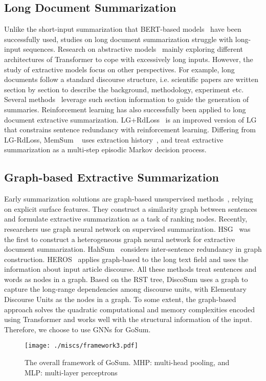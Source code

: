 \documentclass[11pt,a4paper]{article}
\begin{document}
\subsection{Long Document Summarization}
Unlike the short-input summarization that BERT-based models~\cite{2019_bertsum} have been successfully used, studies on long document summarization struggle with long-input sequences. 
Research on abstractive models~\cite{bigbrid_2020,hepo_2021} mainly exploring different architectures of Transformer to cope with excessively long inputs.
However, the study of extractive models focus on other perspectives.
For example, long documents follow a standard discourse structure, i.e. scientific papers are written section by section to describe the background, methodology, experiment etc.
Several methods~\cite {localglobal_2019,collins2017supervised,discourse_2021} leverage such section information to guide the generation of summaries.
Reinforcement learning has also successfully been applied to long document extractive summarization.
LG+RdLoss~\cite{rdloss_2020} is an improved version of LG~\cite{localglobal_2019} that constrains sentence redundancy with reinforcement learning.
Differing from LG-RdLoss, MemSum ~\cite{memsum_2022} uses extraction history~\cite{neusumm_history_2018}, and treat extractive summarization as a multi-step episodic Markov decision process.

\subsection{Graph-based Extractive Summarization}
Early summarization solutions are graph-based unsupervised methods~\cite{graph0_2004}, relying on explicit surface features. They construct a similarity graph between sentences and formulate extractive summarization as a task of ranking nodes.
Recently, researchers use graph neural network on supervised summarization.
HSG~\cite{hsg_2020} was the first  to construct a heterogeneous graph neural network for extractive document summarization.
HahSum~\cite{hahsum_2020} considers inter-sentence redundancy in graph construction.
HEROS~\cite{discourse_2021} applies graph-based to the long text field and uses the information about input article discourse.
All these methods treat sentences and words as nodes in a graph.
Based on the RST tree, DiscoSum\cite{disco_2020} uses a graph  to capture the long-range dependencies among discourse units,  with  Elementary Discourse Units as the nodes in a graph.
 To some extent, the graph-based approach solves the quadratic computational and memory complexities encoded using Transformer and works well with the structural information of the input. Therefore, we choose to use GNNs for GoSum.
 \begin{figure*}[htp]
    \centering
    \texttt{[image: ./miscs/framework3.pdf]}
    \caption{The overall framework of GoSum. MHP: multi-head pooling, and MLP: multi-layer perceptrons }
    \label{fig_framework}
\end{figure*}
 
\end{document}
